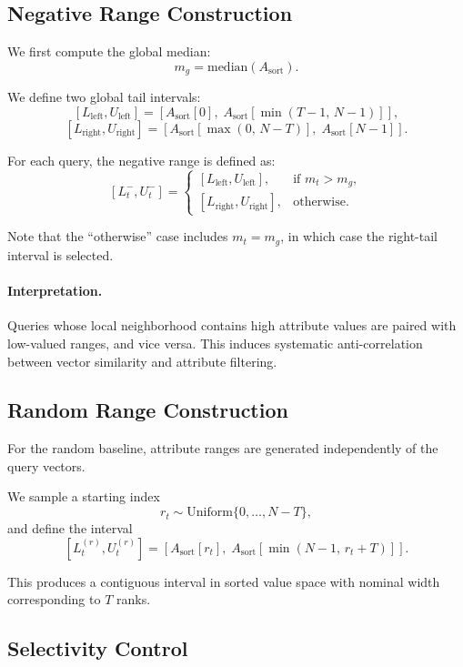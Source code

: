 \subsection{Negative Range Construction}

We first compute the global median:
\[
m_g = \mathrm{median}(A_{\mathrm{sort}}).
\]

We define two global tail intervals:
\[
[L_{\text{left}}, U_{\text{left}}] =
[A_{\mathrm{sort}}[0],\; A_{\mathrm{sort}}[\min(T-1,\, N-1)]],
\]
\[
[L_{\text{right}}, U_{\text{right}}] =
[A_{\mathrm{sort}}[\max(0,\, N-T)],\; A_{\mathrm{sort}}[N-1]].
\]

For each query, the negative range is defined as:
\[
[L_t^-, U_t^-] =
\begin{cases}
[L_{\text{left}}, U_{\text{left}}], & \text{if } m_t > m_g, \\
[L_{\text{right}}, U_{\text{right}}], & \text{otherwise}.
\end{cases}
\]

Note that the ``otherwise'' case includes $m_t = m_g$, in which case the right-tail interval is selected.

\paragraph{Interpretation.}
Queries whose local neighborhood contains high attribute values are paired with low-valued ranges, and vice versa. This induces systematic anti-correlation between vector similarity and attribute filtering.

\subsection{Random Range Construction}

For the random baseline, attribute ranges are generated independently of the query vectors.

We sample a starting index
\[
r_t \sim \mathrm{Uniform}\{0, \dots, N - T\},
\]
and define the interval
\[
[L_t^{(r)}, U_t^{(r)}] =
[A_{\mathrm{sort}}[r_t],\; A_{\mathrm{sort}}[\min(N-1,\, r_t + T)]].
\]

This produces a contiguous interval in sorted value space with nominal width corresponding to $T$ ranks.

\subsection{Selectivity Control}

